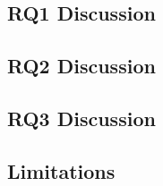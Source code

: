 \subsection{RQ1 Discussion}
\subsection{RQ2 Discussion}
\subsection{RQ3 Discussion}
\subsection{Limitations}